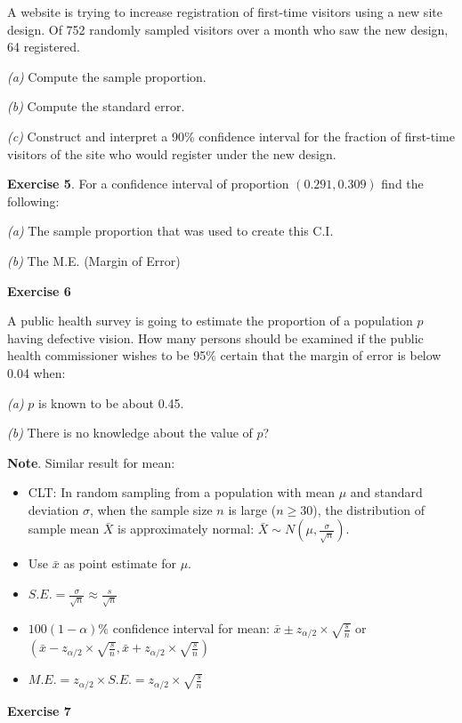 \documentclass[
]{book}
\begin{document}
A website is trying to increase registration of first-time visitors using a new site design. Of 752 randomly sampled visitors over a month who saw the new design, 64 registered.

\emph{(a)} Compute the sample proportion.

\emph{(b)} Compute the standard error.

\emph{(c)} Construct and interpret a 90\% confidence interval for the fraction of first-time visitors of the site who would register under the new design.

\textbf{Exercise 5}. For a confidence interval of proportion \((0.291, 0.309)\) find the following:

\emph{(a)} The sample proportion that was used to create this C.I.

\emph{(b)} The M.E. (Margin of Error)

\textbf{Exercise 6}

A public health survey is going to estimate the proportion of a population \(p\) having defective vision. How many persons should be examined if the public health commissioner wishes to be 95\% certain that the margin of error is below 0.04 when:

\emph{(a)} \(p\) is known to be about 0.45.

\emph{(b)} There is no knowledge about the value of \(p\)?

\textbf{Note}. Similar result for mean:

\begin{itemize}
\item
  CLT: In random sampling from a population with mean \(\mu\) and standard deviation \(\sigma\), when the sample size \(n\) is large (\(n \geq 30\)), the distribution of sample mean \(\bar{X}\) is approximately normal: \(\bar{X} \sim N(\mu, \frac{\sigma}{\sqrt{n}})\).
\item
  Use \(\bar{x}\) as point estimate for \(\mu\).
\item
  \(S.E. = \frac{\sigma}{\sqrt{n}} \approx \frac{s}{\sqrt{n}}\)
\item
  \(100(1-\alpha)\%\) confidence interval for mean: \(\bar{x} \pm z_{\alpha/2} \times \sqrt{\frac{s}{n}}\) or \((\bar{x} - z_{\alpha/2} \times \sqrt{\frac{s}{n}}, \bar{x} + z_{\alpha/2} \times \sqrt{\frac{s}{n}})\)
\item
  \(M.E. = z_{\alpha/2} \times S.E. = z_{\alpha/2} \times \sqrt{\frac{s}{n}}\)
\end{itemize}

\textbf{Exercise 7}
\end{document}
